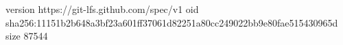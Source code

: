 version https://git-lfs.github.com/spec/v1
oid sha256:11151b2b648a3bf23a601ff37061d82251a80cc249022bb9e80fae515430965d
size 87544
